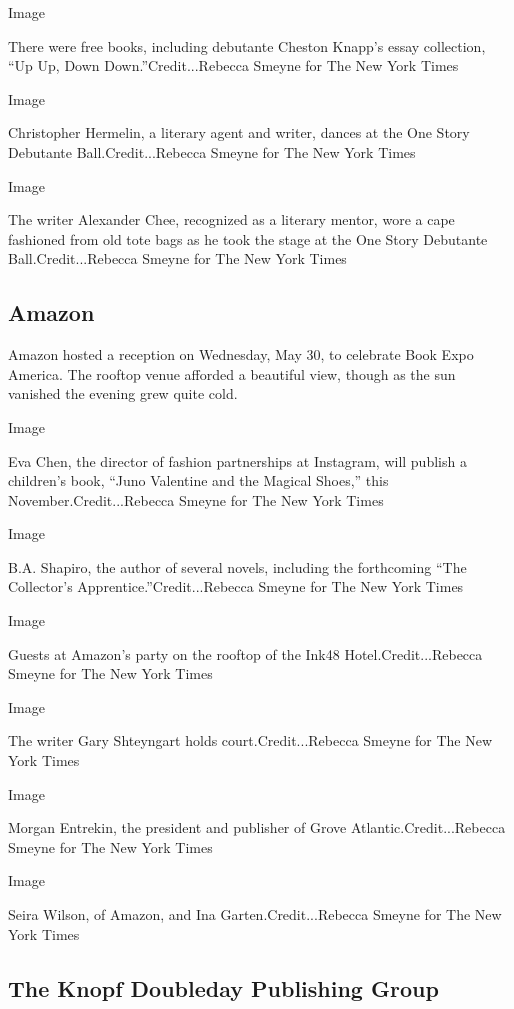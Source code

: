 Image

There were free books, including debutante Cheston Knapp's essay
collection, ``Up Up, Down Down.''Credit...Rebecca Smeyne for The New
York Times

Image

Christopher Hermelin, a literary agent and writer, dances at the One
Story Debutante Ball.Credit...Rebecca Smeyne for The New York Times

Image

The writer Alexander Chee, recognized as a literary mentor, wore a cape
fashioned from old tote bags as he took the stage at the One Story
Debutante Ball.Credit...Rebecca Smeyne for The New York Times

\hypertarget{amazon}{%
\subsection{Amazon}\label{amazon}}

Amazon hosted a reception on Wednesday, May 30, to celebrate Book Expo
America. The rooftop venue afforded a beautiful view, though as the sun
vanished the evening grew quite cold.

Image

Eva Chen, the director of fashion partnerships at Instagram, will
publish a children's book, ``Juno Valentine and the Magical Shoes,''
this November.Credit...Rebecca Smeyne for The New York Times

Image

B.A. Shapiro, the author of several novels, including the forthcoming
``The Collector's Apprentice.''Credit...Rebecca Smeyne for The New York
Times

Image

Guests at Amazon's party on the rooftop of the Ink48
Hotel.Credit...Rebecca Smeyne for The New York Times

Image

The writer Gary Shteyngart holds court.Credit...Rebecca Smeyne for The
New York Times

Image

Morgan Entrekin, the president and publisher of Grove
Atlantic.Credit...Rebecca Smeyne for The New York Times

Image

Seira Wilson, of Amazon, and Ina Garten.Credit...Rebecca Smeyne for The
New York Times

\hypertarget{the-knopf-doubleday-publishing-group}{%
\subsection{The Knopf Doubleday Publishing
Group}\label{the-knopf-doubleday-publishing-group}}

